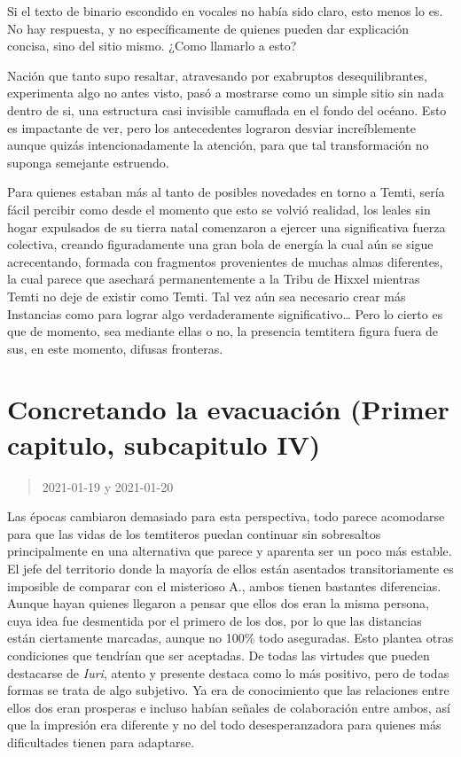 \documentclass[
  spanish,
]{book}
\begin{document}
Si el texto de binario escondido en vocales no había sido claro, esto menos lo es.
No hay respuesta, y no específicamente de quienes pueden dar explicación concisa, sino del sitio mismo. ¿Como llamarlo a esto?

Nación que tanto supo resaltar, atravesando por exabruptos desequilibrantes, experimenta algo no antes visto, pasó a mostrarse como un simple sitio sin nada dentro de si, una estructura casi invisible camuflada en el fondo del océano. Esto es impactante de ver, pero los antecedentes lograron desviar increíblemente aunque quizás intencionadamente la atención, para que tal transformación no suponga semejante estruendo.

Para quienes estaban más al tanto de posibles novedades en torno a Temti, sería fácil percibir como desde el momento que esto se volvió realidad, los leales sin hogar expulsados de su tierra natal comenzaron a ejercer una significativa fuerza colectiva, creando figuradamente una gran bola de energía la cual aún se sigue acrecentando, formada con fragmentos provenientes de muchas almas diferentes, la cual parece que asechará permanentemente a la Tribu de Hixxel mientras Temti no deje de existir como Temti. Tal vez aún sea necesario crear más Instancias como para lograr algo verdaderamente significativo\ldots{} Pero lo cierto es que de momento, sea mediante ellas o no, la presencia temtitera figura fuera de sus, en este momento, difusas fronteras.

\hypertarget{concretando-la-evacuaciuxf3n-primer-capitulo-subcapitulo-iv}{%
\section{Concretando la evacuación (Primer capitulo, subcapitulo IV)}\label{concretando-la-evacuaciuxf3n-primer-capitulo-subcapitulo-iv}}

\begin{quote}
2021-01-19 y 2021-01-20
\end{quote}

Las épocas cambiaron demasiado para esta perspectiva, todo parece acomodarse para que las vidas de los temtiteros puedan continuar sin sobresaltos principalmente en una alternativa que parece y aparenta ser un poco más estable. El jefe del territorio donde la mayoría de ellos están asentados transitoriamente es imposible de comparar con el misterioso A., ambos tienen bastantes diferencias. Aunque hayan quienes llegaron a pensar que ellos dos eran la misma persona, cuya idea fue desmentida por el primero de los dos, por lo que las distancias están ciertamente marcadas, aunque no 100\% todo aseguradas.
Esto plantea otras condiciones que tendrían que ser aceptadas.
De todas las virtudes que pueden destacarse de \emph{Iuri}, atento y presente destaca como lo más positivo, pero de todas formas se trata de algo subjetivo. Ya era de conocimiento que las relaciones entre ellos dos eran prosperas e incluso habían señales de colaboración entre ambos, así que la impresión era diferente y no del todo desesperanzadora para quienes más dificultades tienen para adaptarse.
\end{document}
